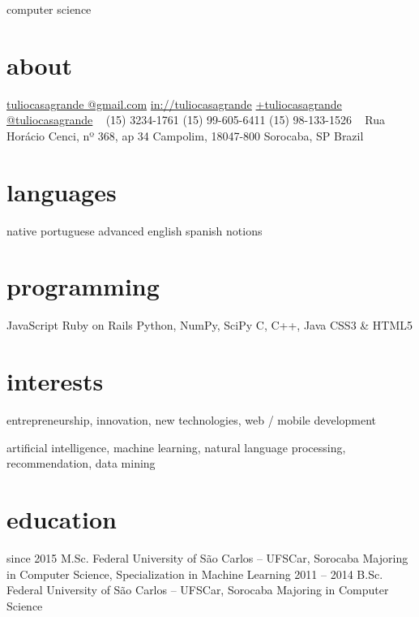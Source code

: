 \documentclass[]{friggeri-cv}
\begin{document}
       {computer science}


\begin{aside}
  \section{about}
    \href{mailto:tuliocasagrande@gmail.com}{tuliocasagrande @gmail.com}
    \href{http://www.linkedin.com/in/tuliocasagrande}{in://tuliocasagrande}
    \href{https://plus.google.com/+tuliocasagrande}{+tuliocasagrande}
    \href{https://twitter.com/tuliocasagrande}{@tuliocasagrande}
    ~
    (15) 3234-1761
    (15) 99-605-6411
    (15) 98-133-1526
    ~
    Rua Horácio Cenci,
    nº 368, ap 34
    Campolim, 18047-800
    Sorocaba, SP
    Brazil
  \section{languages}
    native portuguese
    advanced english
    spanish notions
  \section{programming}
    JavaScript
    Ruby on Rails
    Python, NumPy, SciPy
    C, C++, Java
    CSS3 \& HTML5
\end{aside}

\section{interests}

entrepreneurship, innovation, new technologies, web / mobile development

artificial intelligence, machine learning, natural language processing, recommendation, data mining

\section{education}

\begin{entrylist}
  \entry
   {since 2015}
   {M.Sc.}
   {Federal University of São Carlos -- UFSCar, Sorocaba}
   {Majoring in Computer Science, Specialization in Machine Learning}
  \entry
    {2011 – 2014}
    {B.Sc.}
    {Federal University of São Carlos -- UFSCar, Sorocaba}
    {Majoring in Computer Science}
\end{entrylist}
\end{document}

